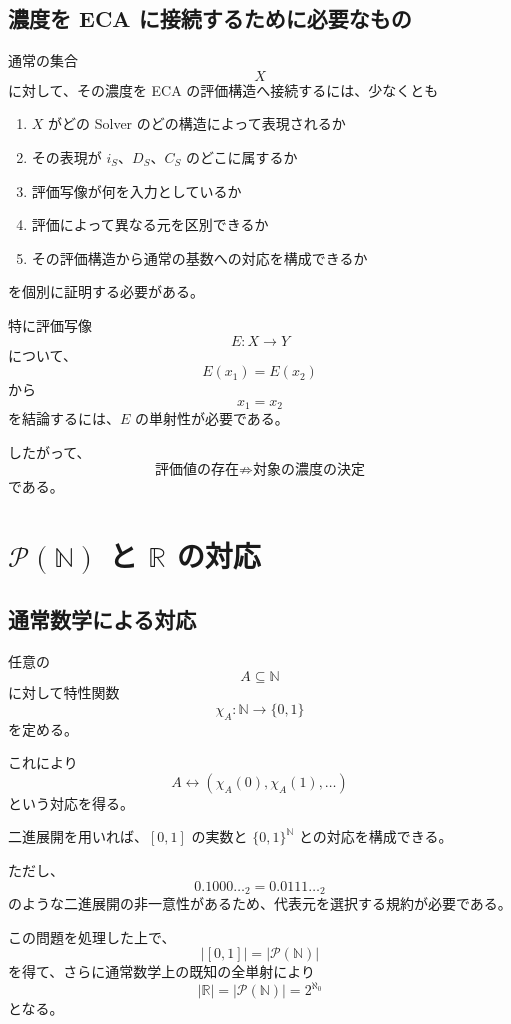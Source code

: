 \documentclass[a4paper,11pt]{article}
\newcommand{\N}{\mathbb{N}}
\newcommand{\R}{\mathbb{R}}
\newcommand{\Pow}{\mathcal{P}}
\begin{document}
\subsection{濃度を ECA に接続するために必要なもの}

通常の集合
\[
X
\]
に対して、その濃度を ECA の評価構造へ接続するには、少なくとも

\begin{enumerate}
\item $X$ がどの Solver のどの構造によって表現されるか
\item その表現が $i_S$、$D_S$、$C_S$ のどこに属するか
\item 評価写像が何を入力としているか
\item 評価によって異なる元を区別できるか
\item その評価構造から通常の基数への対応を構成できるか
\end{enumerate}

を個別に証明する必要がある。

特に評価写像
\[
E:X\to Y
\]
について、
\[
E(x_1)=E(x_2)
\]
から
\[
x_1=x_2
\]
を結論するには、$E$ の単射性が必要である。

したがって、
\[
\boxed{
\text{評価値の存在}
\not\Rightarrow
\text{対象の濃度の決定}
}
\]
である。

\section{$\mathcal{P}(\mathbb{N})$ と $\mathbb{R}$ の対応}

\subsection{通常数学による対応}

任意の
\[
A\subseteq\N
\]
に対して特性関数
\[
\chi_A:\N\to\{0,1\}
\]
を定める。

これにより
\[
A
\longleftrightarrow
(\chi_A(0),\chi_A(1),\ldots)
\]
という対応を得る。

二進展開を用いれば、$[0,1]$ の実数と $\{0,1\}^{\N}$ との対応を構成できる。

ただし、
\[
0.1000\ldots_2
=
0.0111\ldots_2
\]
のような二進展開の非一意性があるため、代表元を選択する規約が必要である。

この問題を処理した上で、
\[
|[0,1]|=|\Pow(\N)|
\]
を得て、さらに通常数学上の既知の全単射により
\[
\boxed{
|\R|=|\Pow(\N)|=2^{\aleph_0}
}
\]
となる。
\end{document}
